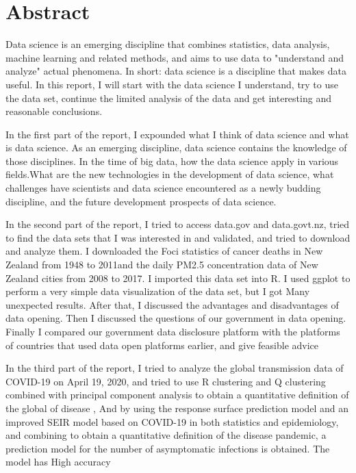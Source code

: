 \documentclass[a4paper, 11pt,twoside=true]{scrartcl}
\author{Kairui Liu\\}
\begin{document}

\maketitle
\restoregeometry
\section*{Abstract}
\qquad Data science is an emerging discipline that combines statistics, data analysis, machine learning and related methods, and aims to use data to "understand and analyze" actual phenomena. In short: data science is a discipline that makes data useful. In this report, I will start with the data science I understand, try to use the data set, continue the limited analysis of the data and get interesting and reasonable conclusions.

\quad In the first part of the report, I expounded what I think of data science and what is data science. As an emerging discipline, data science contains the knowledge of those disciplines. In the time of big data, how the data science apply in various fields.What are the new technologies in the development of data science, what challenges have scientists and data science encountered as a newly budding discipline, and the future development prospects of data science.

\quad In the second part of the report, I tried to access data.gov and data.govt.nz, tried to find the data sets that I was interested in and validated, and tried to download and analyze them. I downloaded the Foci statistics of cancer deaths in New Zealand from 1948 to 2011and the daily PM2.5 concentration data of New Zealand cities from 2008 to 2017. I imported this data set into R. I used ggplot to perform a very simple data visualization of the data set, but I got Many unexpected results. After that, I discussed the advantages and disadvantages of data opening. Then I discussed the questions of our government in data opening. Finally I compared our government data disclosure platform with the platforms of countries that used data open platforms earlier, and give feasible advice

\quad In the third part of the report, I tried to analyze the global transmission data of COVID-19 on April 19, 2020, and tried to use R clustering and Q clustering combined with principal component analysis to obtain a quantitative definition of the global of disease , And by using the response surface prediction model and an improved SEIR model based on COVID-19 in both statistics and epidemiology, and combining to obtain a quantitative definition of the disease pandemic, a prediction model for the number of asymptomatic infections is obtained. The model has High accuracy
\end{document}
